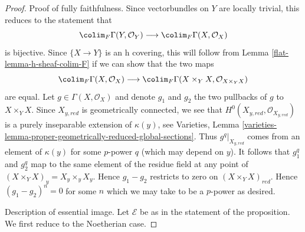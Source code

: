 \begin{proof}

Proof of fully faithfulness. Since vectorbundles on $Y$ are locally
trivial, this reduces to the statement that
$$
\colim_F \Gamma(Y, \mathcal{O}_Y)
\longrightarrow
\colim_F \Gamma(X, \mathcal{O}_X)
$$
is bijective. Since $\{X \to Y\}$ is an h covering, this will
follow from Lemma \ref{flat-lemma-h-sheaf-colim-F} if we can show that the two maps
$$
\colim_F \Gamma(X, \mathcal{O}_X)
\longrightarrow
\colim_F \Gamma(X \times_Y X, \mathcal{O}_{X \times_Y X})
$$
are equal. Let $g \in \Gamma(X, \mathcal{O}_X)$
and denote $g_1$ and $g_2$ the two pullbacks of $g$ to $X \times_Y X$.
Since $X_{y, red}$ is geometrically connected, we
see that $H^0(X_{y, red}, \mathcal{O}_{X_{y, red}})$ is
a purely inseparable extension of $\kappa(y)$, see
Varieties, Lemma
\ref{varieties-lemma-proper-geometrically-reduced-global-sections}.
Thus $g^q|_{X_{y, red}}$ comes from an element of
$\kappa(y)$ for some $p$-power $q$ (which may depend on $y$).
It follows that $g_1^q$ and $g_2^q$ map to the same
element of the residue field at any point of
$(X \times_Y X)_y = X_y \times_y X_y$.
Hence $g_1 - g_2$ restricts to zero on $(X \times_Y X)_{red}$.
Hence $(g_1 - g_2)^n = 0$ for some $n$ which we may take
to be a $p$-power as desired.

\medskip\noindent
Description of essential image. Let $\mathcal{E}$ be as in the statement
of the proposition. We first reduce to the Noetherian case.


\end{proof}
